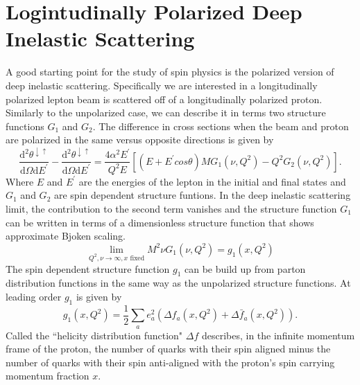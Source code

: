 \documentclass[abstract = on,listof=totoc, bibliography=totoc]{scrreprt}
\begin{document}
\section{Logintudinally Polarized Deep Inelastic Scattering}
A good starting point for the study of spin physics is the polarized version of deep inelastic scattering. Specifically we are interested in a longitudinally polarized lepton beam is scattered off of a longitudinally polarized proton. Similarly to the unpolarized case, we can describe it in terms two structure functions $G_1$ and $G_2$. The difference in cross sections when the beam and proton are polarized in the same versus opposite directions is given by
\begin{equation}
\frac{\text{d}^2 \theta^{\downarrow\uparrow}}{\text{d} \Omega \text{d}E^{'}} - \frac{\text{d}^2\theta^{\downarrow\uparrow}}{\text{d}\Omega\text{d}E^{'}} = \frac{4\alpha^2E^'}{Q^2E}\left[(E+E^{'}cos\theta)MG_1(\nu,Q^2) - Q^2G_2(\nu,Q^2)\right].
\end{equation}
Where $E$ and $E^'$ are the energies of the lepton in the initial and final states and $G_1$ and $G_2$ are spin dependent structure funtions. In the deep inelastic scattering limit, the contribution to the second term vanishes and the structure function $G_1$ can be written in terms of a dimensionless structure function that shows approximate Bjoken scaling\cite{longReviewPaper}. 
\begin{equation}
\lim\limits_{Q^2,\nu \rightarrow\infty, x \text{ fixed}} M^2\nu G_1(\nu,Q^2) = g_1(x,Q^2)
\end{equation} 
The spin dependent structure function $g_1$ can be build up from parton distribution functions in the same way as the unpolarized structure functions. At leading order $g_1$ is given by
\begin{equation}
g_1(x,Q^2) = \frac{1}{2} \sum\limits_a e^2_a\left(\Delta f_a(x,Q^2) + \Delta \bar{f}_a(x,Q^2)\right).
\end{equation}
Called the ``helicity distribution function" $\Delta f$ describes, in the infinite momentum frame of the proton, the number of quarks with their spin aligned minus the number of quarks with their spin anti-aligned with the proton's spin carrying momentum fraction $x$\cite{longReviewPaper}.
\end{document}
